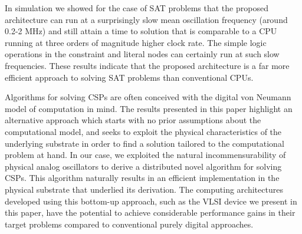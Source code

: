 \documentclass[10pt]{article}
\begin{document}
In simulation we showed for the case of SAT problems that the proposed architecture can run at a surprisingly slow mean oscillation frequency (around 0.2-2 MHz) and still attain a time to solution that is comparable to a CPU running at three orders of magnitude higher clock rate. The simple logic operations in the constraint and literal nodes can certainly run at such slow frequencies. These results indicate that the proposed architecture is a far more efficient approach to solving SAT problems than conventional CPUs. 

Algorithms for solving CSPs are often conceived with the digital von Neumann model of computation in mind. The results presented in this paper highlight an alternative approach which starts with no prior assumptions about the computational model, and seeks to exploit the physical characteristics of the underlying substrate in order to find a solution tailored to the computational problem at hand. In our case, we exploited the natural incommensurability of physical analog oscillators to derive a distributed novel algorithm for solving CSPs. This algorithm naturally results in an efficient implementation in the physical substrate that underlied its derivation. The computing architectures developed using this bottom-up approach, such as the VLSI device we present in this paper, have the potential to achieve considerable performance gains in their target problems compared to conventional purely digital approaches. 
\end{document}
